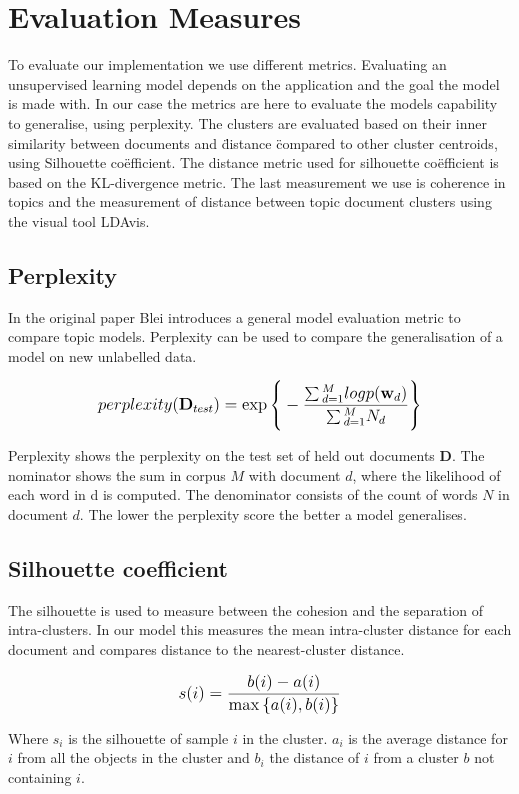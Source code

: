\section{Evaluation Measures}\label{methodology:evaluation measures}
To evaluate our implementation we use different metrics. Evaluating an unsupervised learning model depends on the application and the goal the model is made with. In our case the metrics are here to evaluate the models capability to generalise, using perplexity. The clusters are evaluated based on their inner similarity between documents and \" distance \" compared to other cluster centroids, using Silhouette co\"efficient. The distance metric used for silhouette co\"efficient is based on the KL-divergence metric. The last measurement we use is coherence in topics and the measurement of distance between topic document clusters using the visual tool LDAvis.

\subsection{Perplexity}\label{methodology:perplexity}
In the original paper Blei introduces a general model evaluation metric \cite{Blei2003} to compare topic models. Perplexity can be used to compare the generalisation of a model on new unlabelled data.

\[
   \mathlarger{perplexity(\textbf{D}_{test}) = \exp{\Bigg \{ -\frac{\sum{}_{d=1}^{M}logp(\textbf{w}_d)}{\sum{}_{d=1}^{M}N_d} \Bigg \}}}
\]

Perplexity shows the perplexity on the test set of held out documents $\textbf{D}$. The nominator shows the sum in  corpus $M$ with document $d$, where the likelihood of each word in d is computed. The denominator consists of the count of words $N$ in document $d$.
The lower the perplexity score the better a model generalises.


\subsection{Silhouette coefficient} \label{methodology:silhouette}
The silhouette is used to measure between the cohesion and the separation of intra-clusters. In our model this measures the mean intra-cluster distance for each document and compares distance to the nearest-cluster distance.

\[
   \mathlarger{s(i) = \frac{b(i) - a(i)}{\max{\{ a(i), b(i)}\} } }
\]

Where $s_i$ is the silhouette of sample $i$ in the cluster. $a_i$ is the average distance for $i$ from all the objects in the cluster and $b_i$ the distance of $i$ from a cluster $b$ not containing $i$. 


